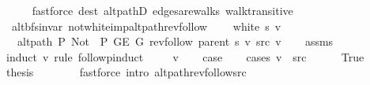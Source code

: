 \begin{isabellebody}
\ \ \ \ \isamarkupfalse%
\ {\isacharparenleft}{\kern0pt}fastforce\ dest{\isacharcolon}{\kern0pt}\ alt{\isacharunderscore}{\kern0pt}pathD{\isacharparenleft}{\kern0pt}{}{\isacharparenright}{\kern0pt}\ edges{\isacharunderscore}{\kern0pt}are{\isacharunderscore}{\kern0pt}walks\ walk{\isacharunderscore}{\kern0pt}transitive{\isacharparenright}{\kern0pt}\isanewline
{}\isamarkupfalse%
%
\endisatagproof
{\isafoldproof}%
%
\isadelimproof
\isanewline
%
\endisadelimproof
\isanewline
{}\isamarkupfalse%
\ {\isacharparenleft}{\kern0pt}\ alt{\isacharunderscore}{\kern0pt}bfs{\isacharunderscore}{\kern0pt}invar{\isacharparenright}{\kern0pt}\ not{\isacharunderscore}{\kern0pt}white{\isacharunderscore}{\kern0pt}imp{\isacharunderscore}{\kern0pt}alt{\isacharunderscore}{\kern0pt}path{\isacharunderscore}{\kern0pt}rev{\isacharunderscore}{\kern0pt}follow{\isacharcolon}{\kern0pt}\isanewline
\ \ \ {\isachardoublequoteopen}{\isasymnot}\ white\ s\ v{\isachardoublequoteclose}\isanewline
\ \ \ {\isachardoublequoteopen}alt{\isacharunderscore}{\kern0pt}path\ P{\isacharprime}{\kern0pt}{\isacharprime}{\kern0pt}\ {\isacharparenleft}{\kern0pt}Not\ {\isasymcirc}\ P{\isacharprime}{\kern0pt}{\isacharprime}{\kern0pt}{\isacharparenright}{\kern0pt}\ {\isacharparenleft}{\kern0pt}G{\isachardot}{\kern0pt}E\ G{\isacharparenright}{\kern0pt}\ {\isacharparenleft}{\kern0pt}rev{\isacharunderscore}{\kern0pt}follow\ {\isacharparenleft}{\kern0pt}parent\ s{\isacharparenright}{\kern0pt}\ v{\isacharparenright}{\kern0pt}\ src\ v{\isachardoublequoteclose}\isanewline
%
\isadelimproof
\ \ %
\endisadelimproof
%
\isatagproof
{}\isamarkupfalse%
\ assms\isanewline
{}\isamarkupfalse%
\ {\isacharparenleft}{\kern0pt}induct\ v\ rule{\isacharcolon}{\kern0pt}\ follow{\isacharunderscore}{\kern0pt}pinduct{\isacharparenright}{\kern0pt}\isanewline
\ \ \isamarkupfalse%
\ {\isacharparenleft}{\kern0pt}{}\ v{\isacharparenright}{\kern0pt}\isanewline
\ \ \isamarkupfalse%
\ {\isacharquery}{\kern0pt}case\isanewline
\ \ \isamarkupfalse%
\ {\isacharparenleft}{\kern0pt}cases\ {\isachardoublequoteopen}v\ {\isacharequal}{\kern0pt}\ src{\isachardoublequoteclose}{\isacharparenright}{\kern0pt}\isanewline
\ \ \ \ \isamarkupfalse%
\ True\isanewline
\ \ \ \ \isamarkupfalse%
\ {\isacharquery}{\kern0pt}thesis\isanewline
\ \ \ \ \ \ \isamarkupfalse%
\ {\isacharparenleft}{\kern0pt}fastforce\ intro{\isacharcolon}{\kern0pt}\ alt{\isacharunderscore}{\kern0pt}path{\isacharunderscore}{\kern0pt}rev{\isacharunderscore}{\kern0pt}follow{\isacharunderscore}{\kern0pt}src{\isacharparenright}{\kern0pt}\isanewline

\end{isabellebody}
